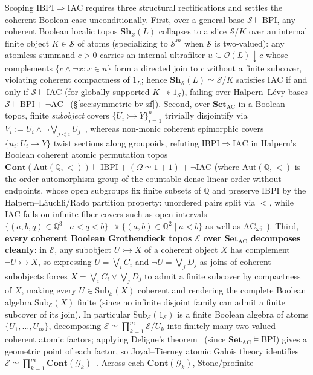 Scoping $\mathrm{IBPI} \Rightarrow \mathrm{IAC}$ requires three structural rectifications and settles the coherent Boolean case unconditionally. First, over a general base $\mathcal{S} \models \mathrm{BPI}$, any coherent Boolean localic topos $\mathbf{Sh}_{\mathcal{S}}(L)$ collapses to a slice $\mathcal{S}/K$ over an internal finite object $K \in \mathcal{S}$ of atoms (specializing to $\mathcal{S}^m$ when $\mathcal{S}$ is two-valued): any atomless summand $c > 0$ carries an internal ultrafilter $u \subseteq \mathcal{O}(L){\downarrow}c$ whose complements $\{c \wedge \neg x : x \in u\}$ form a directed join to $c$ without a finite subcover, violating coherent compactness of $1_L$; hence $\mathbf{Sh}_{\mathcal{S}}(L) \simeq \mathcal{S}/K$ satisfies $\mathrm{IAC}$ if and only if $\mathcal{S} \models \mathrm{IAC}$ (for globally supported $K \twoheadrightarrow 1_{\mathcal{S}}$), failing over Halpern--L\'evy bases $\mathcal{S} \models \mathrm{BPI}+\neg\mathrm{AC}$~\cite{HalpernLevy71} (\S\ref{sec:symmetric-bv-zf}). Second, over $\mathbf{Set}_{\mathrm{AC}}$ in a Boolean topos, finite \emph{subobject} covers $\{U_i \rightarrowtail Y\}_{i=1}^n$ trivially disjointify via $V_i := U_i \wedge \neg\bigvee_{j<i} U_j$~\cite{Johnstone02}, whereas non-monic coherent epimorphic covers $\{u_i : U_i \to Y\}$ twist sections along groupoids, refuting $\mathrm{IBPI} \Rightarrow \mathrm{IAC}$ in Halpern's Boolean coherent atomic permutation topos $\mathbf{Cont}(\mathrm{Aut}(\mathbb{Q}, <)) \models \mathrm{IBPI} + (\Omega \simeq 1+1) + \neg\mathrm{IAC}$ (where $\mathrm{Aut}(\mathbb{Q}, <)$ is the order-automorphism group of the countable dense linear order without endpoints, whose open subgroups fix finite subsets of $\mathbb{Q}$ and preserve $\mathrm{IBPI}$ by the Halpern--L\"auchli/Rado partition property: unordered pairs split via $<$, while $\mathrm{IAC}$ fails on infinite-fiber covers such as open intervals $\{(a, b, q) \in \mathbb{Q}^3 \mid a < q < b\} \twoheadrightarrow \{(a, b) \in \mathbb{Q}^2 \mid a < b\}$ as well as $\mathrm{AC}_\omega$;~\cite{Caramello18,Kihara26}). Third, \textbf{every coherent Boolean Grothendieck topos $\mathcal{E}$ over $\mathbf{Set}_{\mathrm{AC}}$ decomposes cleanly}: in $\mathcal{E}$, any subobject $U \rightarrowtail X$ of a coherent object $X$ has complement $\neg U \rightarrowtail X$, so expressing $U = \bigvee_i C_i$ and $\neg U = \bigvee_j D_j$ as joins of coherent subobjects forces $X = \bigvee_i C_i \vee \bigvee_j D_j$ to admit a finite subcover by compactness of $X$, making every $U \in \mathrm{Sub}_{\mathcal{E}}(X)$ coherent and rendering the complete Boolean algebra $\mathrm{Sub}_{\mathcal{E}}(X)$ finite (since no infinite disjoint family can admit a finite subcover of its join). In particular $\mathrm{Sub}_{\mathcal{E}}(1_{\mathcal{E}})$ is a finite Boolean algebra of atoms $\{U_1, \dots, U_m\}$, decomposing $\mathcal{E} \simeq \prod_{k=1}^m \mathcal{E}/U_k$ into finitely many two-valued coherent atomic factors; applying Deligne's theorem~\cite{Deligne72} (since $\mathbf{Set}_{\mathrm{AC}} \models \mathrm{BPI}$) gives a geometric point of each factor, so Joyal--Tierney atomic Galois theory identifies $\mathcal{E} \simeq \prod_{k=1}^m \mathbf{Cont}(\mathcal{G}_k)$~\cite[\S C5.3]{Johnstone02}. Across each $\mathbf{Cont}(\mathcal{G}_k)$, Stone/profinite 